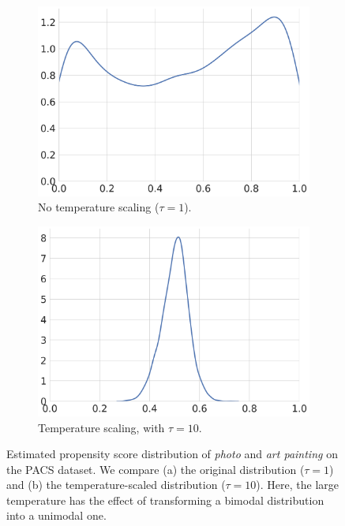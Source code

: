 \begin{figure}[ht!]
     \centering
     \begin{subfigure}[b]{0.49\textwidth}
         \centering
         \includegraphics[scale=0.2]{figures/ps_photo_artpainting_temp1.png}
         \caption{No temperature scaling ($\tau=1$).}
     \end{subfigure}
     \hfill
     \begin{subfigure}[b]{0.49\textwidth}
         \centering
         \includegraphics[scale=0.2]{figures/ps_photo_artpainting_temp10.png}
         \caption{Temperature scaling, with $\tau=10$.}
     \end{subfigure}
    \caption{
        Estimated propensity score distribution of \emph{photo} and \emph{art painting} on the
        PACS dataset. We compare (a) the original distribution ($\tau=1$) and (b) the
        temperature-scaled distribution ($\tau=10$). Here, the large temperature has the effect of
        transforming a bimodal distribution into a unimodal one.
}
    \label{fig:pacs_ps_pa}
\end{figure}
